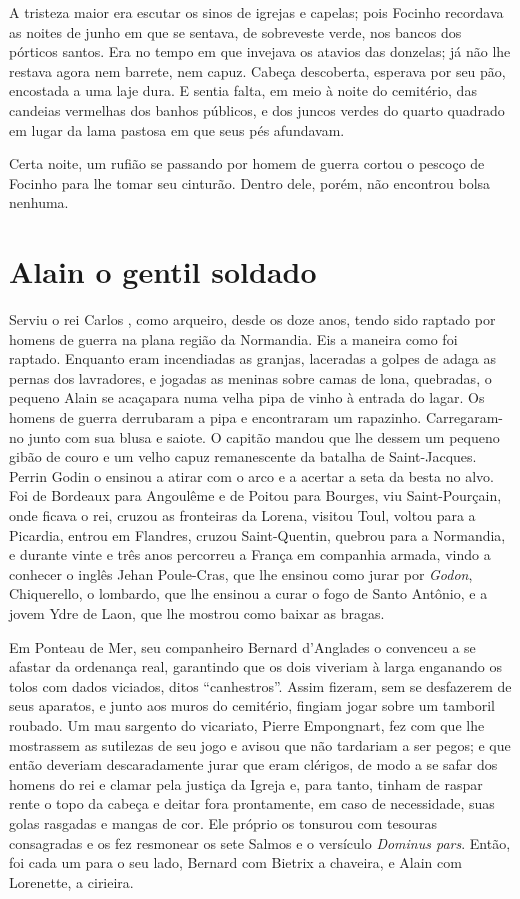 A tristeza maior era escutar os sinos de igrejas e capelas; pois Focinho
recordava as noites de junho em que se sentava, de sobreveste verde, nos
bancos dos pórticos santos. Era no tempo em que invejava os atavios das
donzelas; já não lhe restava agora nem barrete, nem capuz. Cabeça
descoberta, esperava por seu pão, encostada a uma laje dura. E sentia
falta, em meio à noite do cemitério, das candeias vermelhas dos banhos
públicos, e dos juncos verdes do quarto quadrado em lugar da lama pastosa
em que seus pés afundavam.

Certa noite, um rufião se passando por homem de guerra cortou o pescoço de
Focinho para lhe tomar seu cinturão. Dentro dele, porém, não encontrou
bolsa nenhuma.

\chapter{Alain o gentil soldado}

Serviu o rei Carlos , como arqueiro, desde os doze anos, tendo sido
raptado por homens de guerra na plana região da Normandia. Eis a maneira
como foi raptado. Enquanto eram incendiadas as granjas, laceradas a golpes
de adaga as pernas dos lavradores, e jogadas as meninas sobre camas de
lona, quebradas, o pequeno Alain se acaçapara numa velha pipa de vinho à
entrada do lagar. Os homens de guerra derrubaram a pipa e encontraram um
rapazinho. Carregaram-no junto com sua blusa e saiote. O capitão mandou
que lhe dessem um pequeno gibão de couro e um velho capuz remanescente da
batalha de Saint-Jacques. Perrin Godin o ensinou a atirar com o arco e a
acertar a seta da besta no alvo. Foi de Bordeaux para Angoulême e de
Poitou para Bourges, viu Saint-Pourçain, onde ficava o rei, cruzou as
fronteiras da Lorena, visitou Toul, voltou para a Picardia, entrou em
Flandres, cruzou Saint-Quentin, quebrou para a Normandia, e durante vinte
e três anos percorreu a França em companhia armada, vindo a conhecer o
inglês Jehan Poule-Cras, que lhe ensinou como jurar por \textit{Godon},
Chiquerello, o lombardo, que lhe ensinou a curar o fogo de Santo Antônio,
e a jovem Ydre de Laon, que lhe mostrou como baixar as bragas.

Em Ponteau de Mer, seu companheiro Bernard d’Anglades o convenceu a se
afastar da ordenança real, garantindo que os dois viveriam à larga
enganando os tolos com dados viciados, ditos “canhestros”. Assim fizeram,
sem se desfazerem de seus aparatos, e junto aos muros do cemitério,
fingiam jogar sobre um tamboril roubado. Um mau sargento do vicariato,
Pierre Empongnart, fez com que lhe mostrassem as sutilezas de seu jogo e
avisou que não tardariam a ser pegos; e que então deveriam descaradamente
jurar que eram clérigos, de modo a se safar dos homens do rei e clamar
pela justiça da Igreja e, para tanto, tinham de raspar rente o topo da
cabeça e deitar fora prontamente, em caso de necessidade, suas golas
rasgadas e mangas de cor. Ele próprio os tonsurou com tesouras consagradas
e os fez resmonear os sete Salmos e o versículo \textit{Dominus pars}.
Então, foi cada um para o seu lado, Bernard com Bietrix a chaveira, e Alain
com Lorenette, a cirieira.

